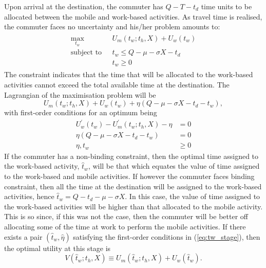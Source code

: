 \documentclass[12pt,a4paper,british]{article}
\begin{document}
Upon arrival at the destination, the commuter has $Q-T-t_{d}$ time units to be allocated between the mobile and work-based activities.
As travel time is realised, the commuter faces no uncertainty and his/her problem amounts to:
\begin{align}
\begin{split}
\max_{t_{w}} \quad & U_{m}\left(t_{w} ; t_{h}, X \right) + U_{w}\left(t_{w}\right) \\
\mbox{subject to } \,\, & t_{w} \leq Q-\mu-\sigma X-t_{d} \\
 & t_w \geq 0
\end{split}
\label{eq:secondStageProb}
\end{align}
The constraint indicates that the time that will be allocated to the work-based activities cannot exceed the total available time at the
destination. The Lagrangian of the maximisation problem will be%
\begin{equation*}
U_{m}\left(t_{w}; t_{h}, X \right) + U_{w}\left( t_{w}\right)+\eta\left(Q-\mu-\sigma X-t_{d}-t_{w}\right),
\end{equation*}
with first-order conditions for an optimum being%
\begin{subequations}
	\label{eq:tw_stage}
	\begin{align}
	U_{w}^{\prime}\left(t_{w}\right) - U_{m}^{\prime}\left(t_{w}; t_{h}, X\right)-\eta & =0
	\label{eq:stage2_wrt_tw}\\
	\eta\left(Q-\mu-\sigma X-t_{d}-t_{w}\right) & =0\label{eq:stage2_compl}\\
	\eta,t_{w} & \geq 0
	\label{eq:stage2_nonnegative}
	\end{align}
\end{subequations}
If the commuter has a non-binding constraint, then the optimal time assigned to the work-based activity, $\hat{t}_{w}$, will be that which equates the value of time assigned to the work-based and mobile activities. If however the commuter faces binding constraint, then all the time at the destination will be assigned to the work-based activities, hence $\hat{t}_{w}=Q-t_{d}-\mu-\sigma X$. In this case, the value of time assigned to the work-based activities will be higher than that allocated to the mobile activity. This is so since, if this was not the case, then the commuter will be better off allocating some of the time at work to perform the mobile activities. If there exists a pair $\left(\hat{t}_{w},\hat{\eta}\right)$ satisfying the first-order conditions in (\ref{eq:tw_stage}), then the optimal utility at this stage is%
\begin{equation*}
V\left(\hat{t}_{w};t_{h}, X\right)\equiv U_{m}\left(\hat{t}_{w}; t_{h}, X\right) + U_{w}\left(\hat{t}_{w}\right).
\end{equation*} %
\end{document}

